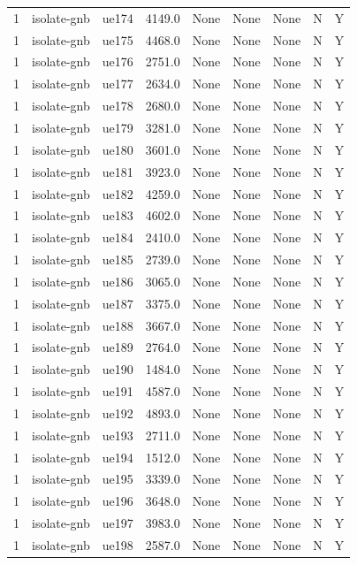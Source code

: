 \begin{table}[ht]
\begin{tabular}{|c|c|c|c|c|c|c|c|c|}
1 & isolate-gnb & ue174 & 4149.0 & None & None & None & N & Y \\
1 & isolate-gnb & ue175 & 4468.0 & None & None & None & N & Y \\
1 & isolate-gnb & ue176 & 2751.0 & None & None & None & N & Y \\
1 & isolate-gnb & ue177 & 2634.0 & None & None & None & N & Y \\
1 & isolate-gnb & ue178 & 2680.0 & None & None & None & N & Y \\
1 & isolate-gnb & ue179 & 3281.0 & None & None & None & N & Y \\
1 & isolate-gnb & ue180 & 3601.0 & None & None & None & N & Y \\
1 & isolate-gnb & ue181 & 3923.0 & None & None & None & N & Y \\
1 & isolate-gnb & ue182 & 4259.0 & None & None & None & N & Y \\
1 & isolate-gnb & ue183 & 4602.0 & None & None & None & N & Y \\
1 & isolate-gnb & ue184 & 2410.0 & None & None & None & N & Y \\
1 & isolate-gnb & ue185 & 2739.0 & None & None & None & N & Y \\
1 & isolate-gnb & ue186 & 3065.0 & None & None & None & N & Y \\
1 & isolate-gnb & ue187 & 3375.0 & None & None & None & N & Y \\
1 & isolate-gnb & ue188 & 3667.0 & None & None & None & N & Y \\
1 & isolate-gnb & ue189 & 2764.0 & None & None & None & N & Y \\
1 & isolate-gnb & ue190 & 1484.0 & None & None & None & N & Y \\
1 & isolate-gnb & ue191 & 4587.0 & None & None & None & N & Y \\
1 & isolate-gnb & ue192 & 4893.0 & None & None & None & N & Y \\
1 & isolate-gnb & ue193 & 2711.0 & None & None & None & N & Y \\
1 & isolate-gnb & ue194 & 1512.0 & None & None & None & N & Y \\
1 & isolate-gnb & ue195 & 3339.0 & None & None & None & N & Y \\
1 & isolate-gnb & ue196 & 3648.0 & None & None & None & N & Y \\
1 & isolate-gnb & ue197 & 3983.0 & None & None & None & N & Y \\
1 & isolate-gnb & ue198 & 2587.0 & None & None & None & N & Y \\

\end{tabular}
\end{table}
